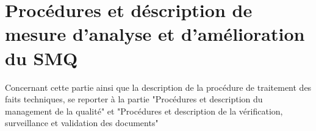 \section{Procédures et déscription de mesure d'analyse et d'amélioration du SMQ}\label{qualite}

Concernant cette partie ainsi que la description de la procédure de traitement des faits techniques, se reporter à la partie "Procédures et description du management de la qualité" et "Procédures et description de la vérification, surveillance et validation des documents"
